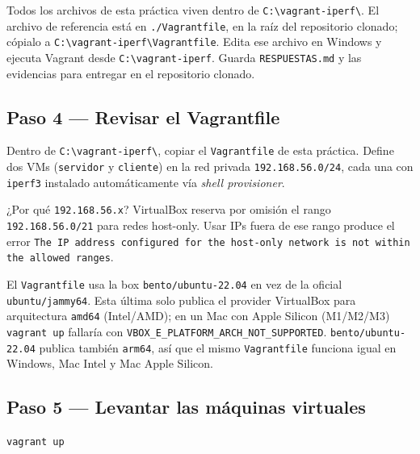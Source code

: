 \documentclass[12pt]{article}
\begin{document}
\begin{note}
Todos los archivos de esta práctica viven dentro de \texttt{C:\textbackslash vagrant-iperf\textbackslash}. El archivo de referencia está en \texttt{./Vagrantfile}, en la raíz del repositorio clonado; cópialo a \texttt{C:\textbackslash vagrant-iperf\textbackslash Vagrantfile}. Edita ese archivo en Windows y ejecuta Vagrant desde \texttt{C:\textbackslash vagrant-iperf}. Guarda \texttt{RESPUESTAS.md} y las evidencias para entregar en el repositorio clonado.
\end{note}

\subsection{Paso 4 --- Revisar el Vagrantfile}

Dentro de \texttt{C:\textbackslash vagrant-iperf\textbackslash}, copiar el \texttt{Vagrantfile} de esta práctica. Define dos VMs (\texttt{servidor} y \texttt{cliente}) en la red privada \texttt{192.168.56.0/24}, cada una con \texttt{iperf3} instalado automáticamente vía \emph{shell provisioner}.

\begin{note}
¿Por qué \texttt{192.168.56.x}? VirtualBox reserva por omisión el rango \texttt{192.168.56.0/21} para redes host-only. Usar IPs fuera de ese rango produce el error \texttt{The IP address configured for the host-only network is not within the allowed ranges}.
\end{note}

\begin{note}
El \texttt{Vagrantfile} usa la box \texttt{bento/ubuntu-22.04} en vez de la oficial \texttt{ubuntu/jammy64}. Esta última solo publica el provider VirtualBox para arquitectura \texttt{amd64} (Intel/AMD); en un Mac con Apple Silicon (M1/M2/M3) \texttt{vagrant up} fallaría con \texttt{VBOX\_E\_PLATFORM\_ARCH\_NOT\_SUPPORTED}. \texttt{bento/ubuntu-22.04} publica también \texttt{arm64}, así que el mismo \texttt{Vagrantfile} funciona igual en Windows, Mac Intel y Mac Apple Silicon.
\end{note}

\subsection{Paso 5 --- Levantar las máquinas virtuales}

\begin{center}
\texttt{vagrant up}
\end{center}
\end{document}
